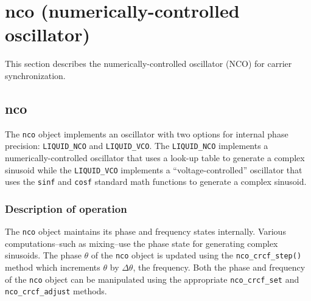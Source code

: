 % 
%

\section{nco (numerically-controlled oscillator)}
\label{module:nco}
This section describes the numerically-controlled oscillator (NCO) for carrier
synchronization.

\subsection{{nco}}
\label{module:nco:nco}
The {\tt nco} object implements an oscillator with two options for internal
phase precision: {\tt LIQUID\_NCO} and {\tt LIQUID\_VCO}.
The {\tt LIQUID\_NCO} implements a numerically-controlled oscillator that uses
a look-up table to generate a complex sinusoid while
the {\tt LIQUID\_VCO} implements a ``voltage-controlled'' oscillator that uses
the {\tt sinf} and {\tt cosf} standard math functions to generate a complex
sinusoid.

\subsubsection{Description of operation}
The {\tt nco} object maintains its phase and frequency states internally.
Various computations--such as mixing--use the phase state for generating
complex sinusoids.
The phase $\theta$ of the {\tt nco} object is updated using the
{\tt nco\_crcf\_step()} method which increments $\theta$ by $\Delta\theta$, the
frequency.
Both the phase and frequency of the {\tt nco} object can be manipulated using
the appropriate {\tt nco\_crcf\_set} and {\tt nco\_crcf\_adjust} methods.

